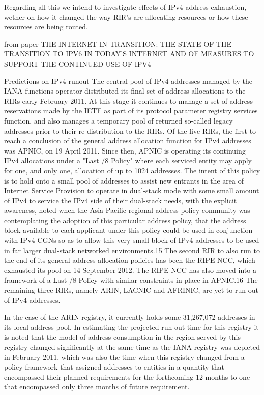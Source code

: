 \documentclass[11pt]{report}
\begin{document}
Regarding all this we intend to investigate effects of IPv4 address exhaustion, wether on how it changed the way RIR's are allocating resources or how these resources are being routed.


from paper THE INTERNET IN TRANSITION: THE STATE OF THE TRANSITION TO IPV6 IN
TODAY'S INTERNET AND OF MEASURES TO SUPPORT THE CONTINUED USE OF
IPV4 

Predictions on IPv4 runout
The central pool of IPv4 addresses managed by the IANA functions operator distributed its final
set of address allocations to the RIRs early February 2011. At this stage it continues to manage a set of
address reservations made by the IETF as part of its protocol parameter registry services function, and also
manages a temporary pool of returned so-called legacy addresses prior to their re-distribution to the RIRs.
Of the five RIRs, the first to reach a conclusion of the general address allocation function for
IPv4 addresses was APNIC, on 19 April 2011. Since then, APNIC is operating its continuing IPv4
allocations under a "Last /8 Policy" where each serviced entity may apply for one, and only one, allocation
of up to 1024 addresses. The intent of this policy is to hold onto a small pool of addresses to assist new
entrants in the area of Internet Service Provision to operate in dual-stack mode with some small amount of
IPv4 to service the IPv4 side of their dual-stack needs, with the explicit awareness, noted when the Asia
Pacific regional address policy community was contemplating the adoption of this particular address
policy, that the address block available to each applicant under this policy could be used in conjunction
with IPv4 CGNs so as to allow this very small block of IPv4 addresses to be used in far larger dual-stack
networked environments.15
The second RIR to also run to the end of its general address allocation policies has been the RIPE
NCC, which exhausted its pool on 14 September 2012. The RIPE NCC has also moved into a framework
of a Last /8 Policy with similar constraints in place in APNIC.16
The remaining three RIRs, namely ARIN, LACNIC and AFRINIC, are yet to run out of IPv4
addresses.

In the case of the ARIN registry, it currently holds some 31,267,072 addresses in its local address
pool. In estimating the projected run-out time for this registry it is noted that the model of address
consumption in the region served by this registry changed significantly at the same time as the IANA
registry was depleted in February 2011, which was also the time when this registry changed from a policy
framework that assigned addresses to entities in a quantity that encompassed their planned requirements
for the forthcoming 12 months to one that encompassed only three months of future requirement.
\end{document}

